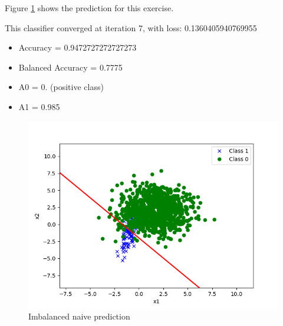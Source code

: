 
\begin{answer}

Figure \ref{fig:vanilla_log_reg} shows the prediction for this exercise.

This classifier converged at iteration 7, with loss: 0.1360405940769955
\begin{itemize}
    \item Accuracy = 0.9472727272727273
    \item Balanced Accuracy = 0.7775
    \item A0 = 0. (positive class)
    \item A1 = 0.985
\end{itemize}

\begin{figure}
    \centering
    \includegraphics[width=0.75\linewidth]{ps1/tex/img/imbalanced_naive_pred.png}
    \caption{Imbalanced naive prediction}
    \label{fig:vanilla_log_reg}
\end{figure}

\end{answer}